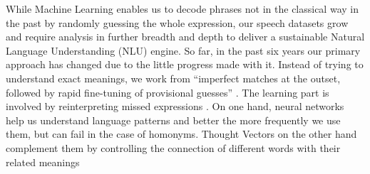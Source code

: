 %
%	
%



While Machine Learning enables us to decode phrases not in the classical way in the past by randomly guessing the whole expression, our speech datasets grow and require analysis in further breadth and depth to deliver a sustainable Natural Language Understanding (NLU) engine.
So far, in the past six years our primary approach has changed due to the little progress made with it. Instead of trying to understand exact meanings, we work from
``imperfect matches at the outset, followed by rapid fine-tuning of provisional guesses'' \cite{mit:Alexa}. The learning part is involved by reinterpreting missed expressions \cite{aws:lex_webinar}. 
On one hand, neural networks help us understand language patterns and better the more frequently we use them, but can fail in the case of homonyms. \cite{mit:AILang} Thought Vectors on the other hand complement them by controlling the connection of different words with their related meanings %

